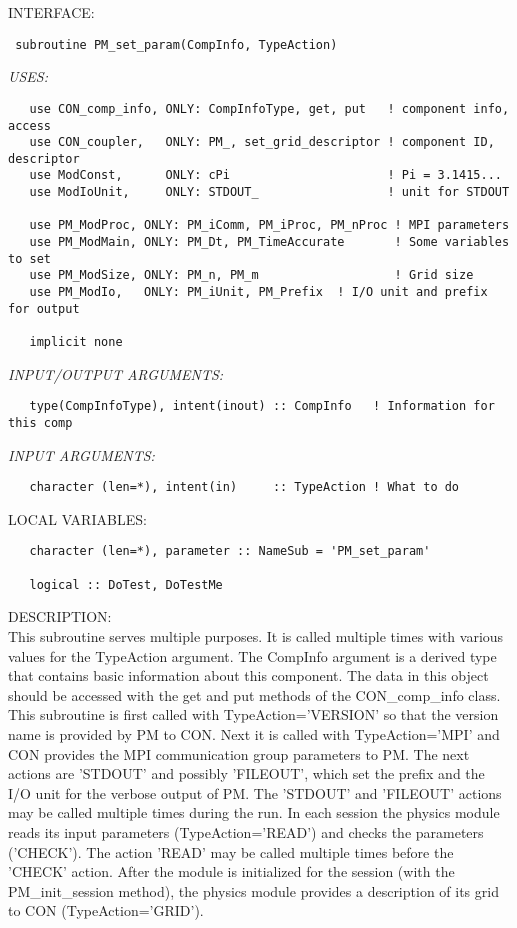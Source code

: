 \bigskip
{\sf INTERFACE:}
\begin{verbatim} subroutine PM_set_param(CompInfo, TypeAction)
 \end{verbatim}
{\em USES:}
\begin{verbatim}   use CON_comp_info, ONLY: CompInfoType, get, put   ! component info, access
   use CON_coupler,   ONLY: PM_, set_grid_descriptor ! component ID, descriptor
   use ModConst,      ONLY: cPi                      ! Pi = 3.1415...
   use ModIoUnit,     ONLY: STDOUT_                  ! unit for STDOUT
 
   use PM_ModProc, ONLY: PM_iComm, PM_iProc, PM_nProc ! MPI parameters
   use PM_ModMain, ONLY: PM_Dt, PM_TimeAccurate       ! Some variables to set
   use PM_ModSize, ONLY: PM_n, PM_m                   ! Grid size
   use PM_ModIo,   ONLY: PM_iUnit, PM_Prefix  ! I/O unit and prefix for output
 
   implicit none
 \end{verbatim}
{\em INPUT/OUTPUT ARGUMENTS:}
\begin{verbatim}   type(CompInfoType), intent(inout) :: CompInfo   ! Information for this comp
 \end{verbatim}
{\em INPUT ARGUMENTS:}
\begin{verbatim}   character (len=*), intent(in)     :: TypeAction ! What to do
 \end{verbatim}
{\sf LOCAL VARIABLES:}
\begin{verbatim}   character (len=*), parameter :: NameSub = 'PM_set_param'
 
   logical :: DoTest, DoTestMe
 \end{verbatim}
{\sf DESCRIPTION:}\\
 
     This subroutine serves multiple purposes. It is called multiple times
     with various values for the TypeAction argument. The CompInfo argument
     is a derived type that contains basic information about this component.
     The data in this object should be accessed with the get and put methods
     of the CON\_comp\_info class. This subroutine is first called with
     TypeAction='VERSION' so that the version name is provided by PM to CON.
     Next it is called with TypeAction='MPI' and CON provides the MPI 
     communication group parameters to PM. The next actions are 'STDOUT' and
     possibly 'FILEOUT', which set the prefix and the I/O unit for 
     the verbose output of PM. The 'STDOUT' and 'FILEOUT' actions may be 
     called multiple times during the run.
     In each session the physics module reads its input parameters
     (TypeAction='READ') and checks the parameters ('CHECK').
     The action 'READ' may be called multiple times before the 'CHECK' action.
     After the module is initialized for the session (with the 
     PM\_init\_session method), the physics module provides a 
     description of its grid to CON (TypeAction='GRID').
     

